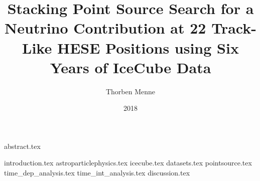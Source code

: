 

\usepackage{aas_macros}

\author{Thorben Menne}
\title{Stacking Point Source Search for a Neutrino Contribution at 22 Track-Like HESE Positions using Six Years of IceCube Data}
\date{2018}

\titlehead{\texttt{[image: inc/tu-logo\_bw.pdf]}}






\frontmatter
\maketitle
\makecorrectorpage
{abstract.tex}

\tableofcontents

\mainmatter
{introduction.tex}
{astroparticlephysics.tex}
{icecube.tex}
{datasets.tex}
{pointsource.tex}
{time_dep_analysis.tex}
{time_int_analysis.tex}
{discussion.tex}

\appendix

\backmatter
\printbibliography

\renewcommand{\listfigurename}{List of figures}
\renewcommand{\listtablename}{List of tables}

\cleardoublepage
\listoffigures

\cleardoublepage
\listoftables




